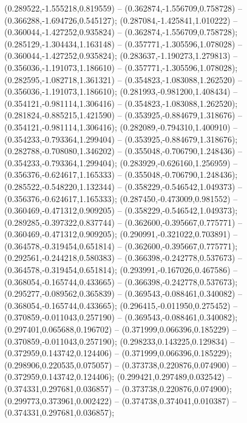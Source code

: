  (0.289522,-1.555218,0.819559) -- (0.362874,-1.556709,0.758728) -- (0.366288,-1.694726,0.545127);
 (0.287084,-1.425841,1.010222) -- (0.360044,-1.427252,0.935824) -- (0.362874,-1.556709,0.758728);
 (0.285129,-1.304434,1.163148) -- (0.357771,-1.305596,1.078028) -- (0.360044,-1.427252,0.935824);
 (0.283637,-1.190273,1.279813) -- (0.356036,-1.191073,1.186610) -- (0.357771,-1.305596,1.078028);
 (0.282595,-1.082718,1.361321) -- (0.354823,-1.083088,1.262520) -- (0.356036,-1.191073,1.186610);
 (0.281993,-0.981200,1.408434) -- (0.354121,-0.981114,1.306416) -- (0.354823,-1.083088,1.262520);
 (0.281824,-0.885215,1.421590) -- (0.353925,-0.884679,1.318676) -- (0.354121,-0.981114,1.306416);
 (0.282089,-0.794310,1.400910) -- (0.354233,-0.793364,1.299404) -- (0.353925,-0.884679,1.318676);
 (0.282788,-0.708080,1.346202) -- (0.355048,-0.706790,1.248436) -- (0.354233,-0.793364,1.299404);
 (0.283929,-0.626160,1.256959) -- (0.356376,-0.624617,1.165333) -- (0.355048,-0.706790,1.248436);
 (0.285522,-0.548220,1.132344) -- (0.358229,-0.546542,1.049373) -- (0.356376,-0.624617,1.165333);
 (0.287450,-0.473009,0.981552) -- (0.360469,-0.471312,0.909205) -- (0.358229,-0.546542,1.049373);
 (0.289285,-0.397322,0.837744) -- (0.362600,-0.395667,0.775771) -- (0.360469,-0.471312,0.909205);
 (0.290991,-0.321022,0.703891) -- (0.364578,-0.319454,0.651814) -- (0.362600,-0.395667,0.775771);
 (0.292561,-0.244218,0.580383) -- (0.366398,-0.242778,0.537673) -- (0.364578,-0.319454,0.651814);
 (0.293991,-0.167026,0.467586) -- (0.368054,-0.165744,0.433665) -- (0.366398,-0.242778,0.537673);
 (0.295277,-0.089562,0.365839) -- (0.369543,-0.088461,0.340082) -- (0.368054,-0.165744,0.433665);
 (0.296415,-0.011950,0.275452) -- (0.370859,-0.011043,0.257190) -- (0.369543,-0.088461,0.340082);
 (0.297401,0.065688,0.196702) -- (0.371999,0.066396,0.185229) -- (0.370859,-0.011043,0.257190);
 (0.298233,0.143225,0.129834) -- (0.372959,0.143742,0.124406) -- (0.371999,0.066396,0.185229);
 (0.298906,0.220535,0.075057) -- (0.373738,0.220876,0.074900) -- (0.372959,0.143742,0.124406);
 (0.299421,0.297489,0.032542) -- (0.374331,0.297681,0.036857) -- (0.373738,0.220876,0.074900);
 (0.299773,0.373961,0.002422) -- (0.374738,0.374041,0.010387) -- (0.374331,0.297681,0.036857);
